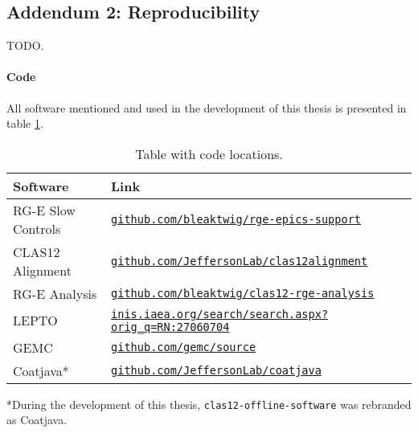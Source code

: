 \subsection*{Addendum 2: Reproducibility}
\label{20.02::reproducibility}
    TODO.


    \paragraph{Code}
    All software mentioned and used in the development of this thesis is presented in table \ref{tab::20.02::code_locations}.

    \begin{table}
        \begin{center}
            \begin{tabularx}{\textwidth}{ll}
                \toprule
                \textbf{Software}  & \textbf{Link} \\
                \midrule \midrule
                RG-E Slow Controls &
                    \href{https://github.com/bleaktwig/rge-epics-support}
                    {\texttt{github.com/bleaktwig/rge-epics-support}} \\
                \midrule
                CLAS12 Alignment   &
                    \href{https://github.com/JeffersonLab/clas12alignment}
                    {\texttt{github.com/JeffersonLab/clas12alignment}} \\
                \midrule
                RG-E Analysis      &
                    \href{https://github.com/bleaktwig/clas12-rge-analysis}
                    {\texttt{github.com/bleaktwig/clas12-rge-analysis}} \\
                LEPTO              &
                    \href{https://inis.iaea.org/search/search.aspx?orig_q=RN:27060704}
                    {\texttt{inis.iaea.org/search/search.aspx?orig\_q=RN:27060704}} \\
                GEMC               &
                    \href{https://github.com/gemc/source}
                    {\texttt{github.com/gemc/source}} \\
                Coatjava*          &
                    \href{https://github.com/JeffersonLab/coatjava}
                    {\texttt{github.com/JeffersonLab/coatjava}} \\
                \bottomrule
            \end{tabularx}
        \end{center}

        \caption{Table with code locations.}
        \label{tab::20.02::code_locations}
    \end{table}

    *During the development of this thesis, \texttt{clas12-offline-software} was rebranded as Coatjava.
